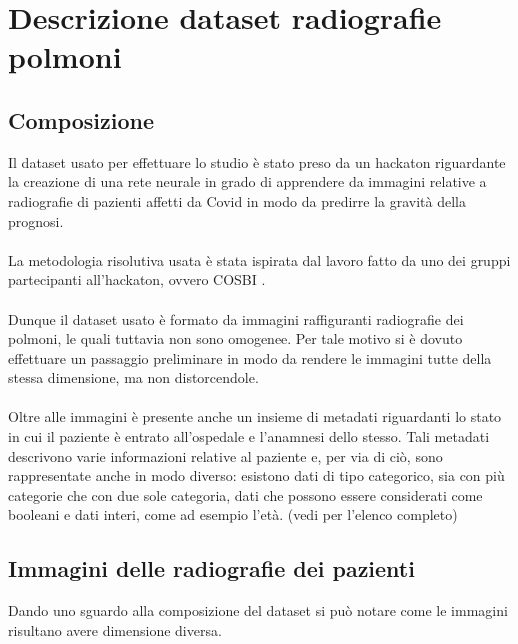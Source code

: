 \chapter{Descrizione dataset radiografie polmoni}
\label{ch:Dataset}
\section{Composizione}
Il dataset usato per effettuare lo studio è stato preso da un hackaton \cite{ai} riguardante la creazione di una rete neurale in grado di apprendere 
da immagini relative a radiografie di pazienti affetti da Covid in modo da predirre la gravità della prognosi.
\\\\
La metodologia risolutiva usata è stata ispirata dal lavoro fatto da uno dei gruppi partecipanti all'hackaton, ovvero COSBI \cite{cch}.
\\\\
Dunque il dataset usato è formato da immagini raffiguranti radiografie dei polmoni, le quali tuttavia non sono omogenee. Per tale motivo 
si è dovuto effettuare un passaggio preliminare in modo da rendere le immagini tutte della stessa dimensione, ma non distorcendole.
\\\\
Oltre alle immagini è presente anche un insieme di metadati riguardanti lo stato in cui il paziente è entrato all'ospedale e l'anamnesi dello stesso.
Tali metadati descrivono varie informazioni relative al paziente e, per via di ciò, sono rappresentate anche in modo diverso: esistono dati di tipo categorico, sia con più categorie che con
due sole categoria, dati che possono essere considerati come booleani e dati interi, come ad esempio l'età.
(vedi \pageref{eterogeneo} per l'elenco completo)
\clearpage
\section{Immagini delle radiografie dei pazienti}
Dando uno sguardo alla composizione del dataset si può notare come le immagini risultano avere dimensione diversa.

